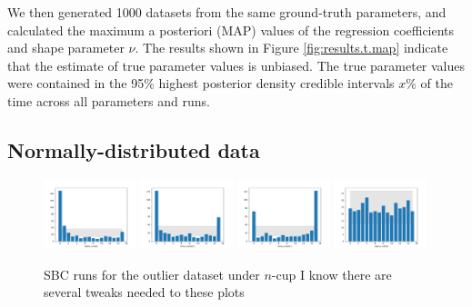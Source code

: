 \documentclass[fleqn,usenatbib]{mnras}
\begin{document}
We then generated 1000 datasets from the same ground-truth parameters, and
calculated the maximum a posteriori (MAP) values of the regression coefficients
and shape parameter $\nu$. The results shown in Figure
\ref{fig:results.t.map} indicate that the estimate of true parameter values is
unbiased.{
\color{red} The true parameter values were contained in the 95\% highest
posterior density credible intervals $x$\% of the time across all parameters and
runs.
}


\subsection{Normally-distributed data}
\label{sec:results.outlier}

\begin{figure}
    \includegraphics[width=0.24\textwidth]{graphics/sbc_outlier_ncup/alpha_scaled.pdf}
    \includegraphics[width=0.24\textwidth]{graphics/sbc_outlier_ncup/beta_scaled.0.pdf}
    \includegraphics[width=0.24\textwidth]{graphics/sbc_outlier_ncup/beta_scaled.1.pdf}
    \includegraphics[width=0.24\textwidth]{graphics/sbc_outlier_ncup/sigma_scaled.pdf}
    \caption{SBC runs for the outlier dataset under $n$-cup {\color{red} I know
    there are several tweaks needed to these plots}}
    \label{fig:results.t.sbc}
\end{figure}
\end{document}
